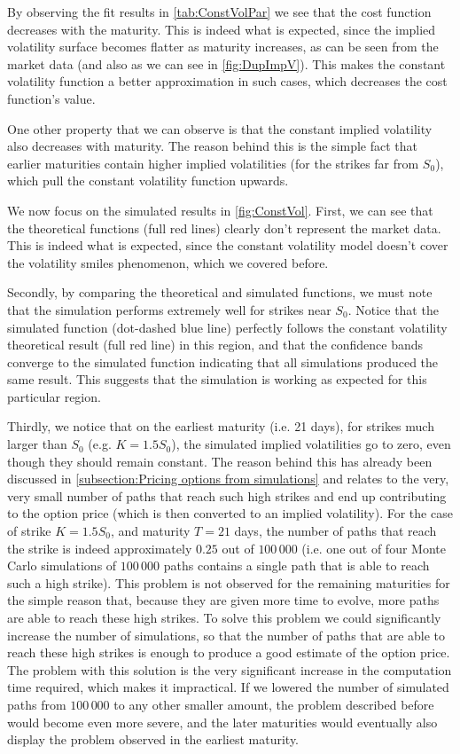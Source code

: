 By observing the fit results in \autoref{tab:ConstVolPar} we see that the cost function decreases with the maturity. This is indeed what is expected, since the implied volatility surface becomes flatter as maturity increases, as can be seen from the market data (and also as we can see in \autoref{fig:DupImpV}). This makes the constant volatility function a better approximation in such cases, which decreases the cost function's value.


One other property that we can observe is that the constant implied volatility also decreases with maturity. The reason behind this is the simple fact that earlier maturities contain higher implied volatilities (for the strikes far from $S_0$), which pull the constant volatility function upwards.


We now focus on the simulated results in \autoref{fig:ConstVol}.
First, we can see that the theoretical functions (full red lines) clearly don't represent the market data. This is indeed what is expected, since the constant volatility model doesn't cover the volatility smiles phenomenon, which we covered before.

Secondly, by comparing the theoretical and simulated functions, we must note that the simulation performs extremely well for strikes near $S_0$. Notice that the simulated function (dot-dashed blue line) perfectly follows the constant volatility theoretical result (full red line) in this region, and that the confidence bands converge to the simulated function indicating that all simulations produced the same result. This suggests that the simulation is working as expected for this particular region.

Thirdly, we notice that on the earliest maturity (i.e. 21 days), for strikes much larger than $S_0$ (e.g. $K=1.5S_0$), the simulated implied volatilities go to zero, even though they should remain constant. The reason behind this has already been discussed in \autoref{subsection:Pricing options from simulations} and relates to the very, very small number of paths that reach such high strikes and end up contributing to the option price (which is then converted to an implied volatility). For the case of strike $K=1.5S_0$, and maturity $T=21$ days, the number of paths that reach the strike is indeed approximately $0.25$ out of $100\,000$ (i.e. one out of four Monte Carlo simulations of $100\,000$ paths contains a single path that is able to reach such a high strike). This problem is not observed for the remaining maturities for the simple reason that, because they are given more time to evolve, more paths are able to reach these high strikes.
To solve this problem we could significantly increase the number of simulations, so that the number of paths that are able to reach these high strikes is enough to produce a good estimate of the option price. The problem with this solution is the very significant increase in the computation time required, which makes it impractical.
If we lowered the number of simulated paths from $100\,000$ to any other smaller amount, the problem described before would become even more severe, and the later maturities would eventually also display the problem observed in the earliest maturity.


